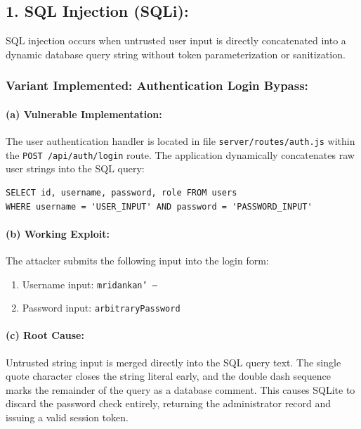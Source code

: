 \documentclass[11pt,a4paper]{article}
\begin{document}
\vspace{8pt}
\subsection*{1. SQL Injection (SQLi):}
SQL injection occurs when untrusted user input is directly concatenated into a dynamic database query string without token parameterization or sanitization.

\subsubsection*{Variant Implemented: Authentication Login Bypass:}

\paragraph*{(a) Vulnerable Implementation:}
The user authentication handler is located in file \texttt{server/routes/auth.js} within the \texttt{POST /api/auth/login} route. The application dynamically concatenates raw user strings into the SQL query:
\begin{lstlisting}
SELECT id, username, password, role FROM users 
WHERE username = 'USER_INPUT' AND password = 'PASSWORD_INPUT'
\end{lstlisting}

\paragraph*{(b) Working Exploit:}
The attacker submits the following input into the login form:
\begin{enumerate}
  \item Username input: \texttt{mridankan' --}
  \item Password input: \texttt{arbitraryPassword}
\end{enumerate}

\paragraph*{(c) Root Cause:}
Untrusted string input is merged directly into the SQL query text. The single quote character closes the string literal early, and the double dash sequence marks the remainder of the query as a database comment. This causes SQLite to discard the password check entirely, returning the administrator record and issuing a valid session token.

\clearpage
\end{document}

